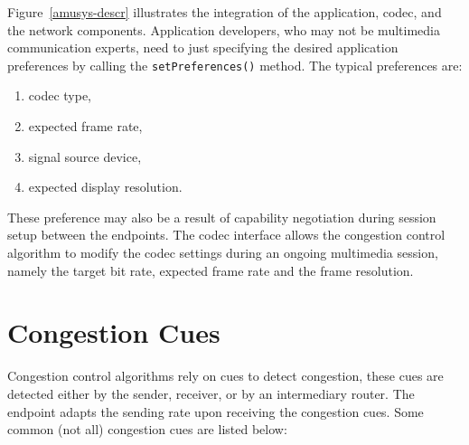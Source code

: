 Figure~\ref{amusys-descr} illustrates the integration of the application,
codec, and the network components. Application developers, who may not be
multimedia communication experts, need to just specifying the desired
application preferences by calling the \texttt{setPreferences()} method. The
typical preferences are:
 
\begin{enumerate}
\setlength{\itemsep}{0pt}
\item codec type,
\item expected frame rate,
\item signal source device,
\item expected display resolution.
\end{enumerate}

These preference may also be a result of capability negotiation during session
setup between the endpoints. The codec interface allows the congestion control
algorithm to modify the codec settings during an ongoing multimedia session,
namely the target bit rate, expected frame rate and the frame resolution.



\section{Congestion Cues}
\label{fw.cues}

Congestion control algorithms rely on cues to detect congestion, these cues
are detected either by the sender, receiver, or by an intermediary router. The
endpoint adapts the sending rate upon receiving the congestion cues. Some
common (not all) congestion cues are listed below:

